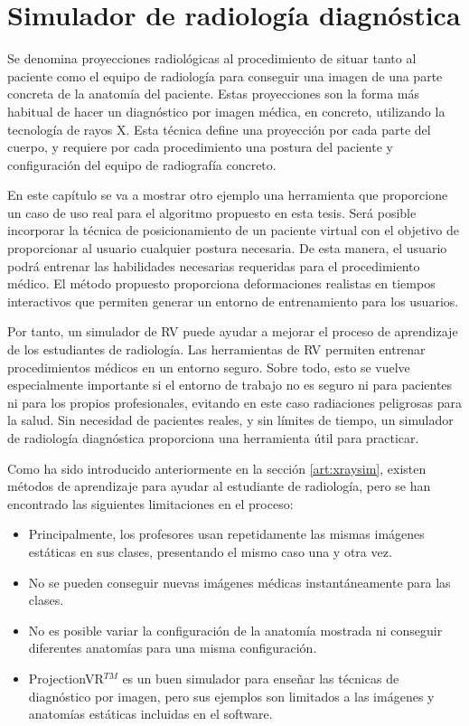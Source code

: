 \chapter{Simulador de radiología diagnóstica} 
\label{cap:xray}

Se denomina proyecciones radiológicas al procedimiento de situar tanto al paciente como el equipo de radiología para conseguir una imagen de una parte concreta de la anatomía del paciente. Estas proyecciones son la forma más habitual de hacer un diagnóstico por imagen médica, en concreto, utilizando la tecnología de rayos X. Esta técnica define una proyección por cada parte del cuerpo, y requiere por cada procedimiento una postura del paciente y configuración del equipo de radiografía concreto. 

En este capítulo se va a mostrar otro ejemplo una herramienta que proporcione un caso de uso real para el algoritmo propuesto en esta tesis. Será posible incorporar la técnica de posicionamiento de un paciente virtual con el objetivo de proporcionar al usuario cualquier postura necesaria. De esta manera, el usuario podrá entrenar las habilidades necesarias requeridas para el procedimiento médico.
El método propuesto proporciona deformaciones realistas en tiempos interactivos que permiten generar un entorno de entrenamiento para los usuarios.

Por tanto, un simulador de \ac{RV} puede ayudar a mejorar el proceso de aprendizaje de los estudiantes de radiología. Las herramientas de \ac{RV} permiten entrenar procedimientos médicos en un entorno seguro. Sobre todo, esto se vuelve especialmente importante si el entorno de trabajo no es seguro ni para pacientes ni para los propios profesionales, evitando en este caso radiaciones peligrosas para la salud. Sin necesidad de pacientes reales, y sin límites de tiempo, un simulador de radiología diagnóstica proporciona una herramienta útil para practicar.

Como ha sido introducido anteriormente en la sección \ref{art:xraysim}, existen métodos de aprendizaje para ayudar al estudiante de radiología, pero se han encontrado las siguientes limitaciones en el proceso:

\begin{itemize}
\item Principalmente, los profesores usan repetidamente las mismas imágenes estáticas en sus clases, presentando el mismo caso una y otra vez.
\item No se pueden conseguir nuevas imágenes médicas instantáneamente para las clases.
\item No es posible variar la configuración de la anatomía mostrada ni conseguir diferentes anatomías para una misma configuración.
\item ProjectionVR$^{TM}$ es un buen simulador para enseñar las técnicas de diagnóstico por imagen, pero sus ejemplos son limitados a las imágenes y anatomías estáticas incluidas en el software.
\end{itemize}

